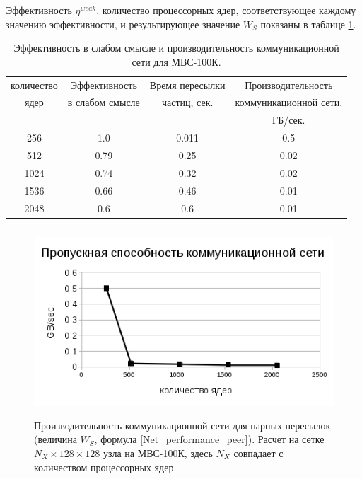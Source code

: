 Эффективность $\eta^{weak}$, количество процессорных ядер, соответствующее каждому значению эффективности, и результирующее значение $W_S$ показаны в таблице \ref{MVS100K_W_S}.

\begin{table}[ht]
\caption{Эффективность в слабом смысле и производительность коммуникационной сети для МВС-100К.}
\begin{center}
	\begin{tabular}{|c|c|c|c|}
		\hline
		количество  & Эффективность & Время пересылки & Производительность  \\
		ядер        & в слабом смысле & частиц, сек.    & коммуникационной сети, \\
		             &                 &                 &  ГБ/сек. \\\hline
		256           & 1.0             &     0.011       & 0.5\\
		512           & 0.79            &     0.25        & 0.02\\
		1024          & 0.74            &     0.32        & 0.02\\
		1536          & 0.66            &     0.46        & 0.01\\	
		2048          & 0.6             &     0.6         & 0.01 \\
		\hline
	\end{tabular}
	\label{MVS100K_W_S}
\end{center}
\end{table}

\begin{figure}[h]
	\begin{center}
		\includegraphics[height=7cm,keepaspectratio]{images/W_S_MVS_100K_on_weak_eff.png}
		\caption{
			Производительность коммуникационной сети для парных пересылок (величина $W_S$, формула \ref{Net_performance_peer}). Расчет на сетке $N_X \times 128 \times 128$ узла на МВС-100К, здесь $N_X$ совпадает с количеством процессорных ядер. 
		}
		\label{scale_W_S_MVS_100K}
	\end{center} 
\end{figure}

